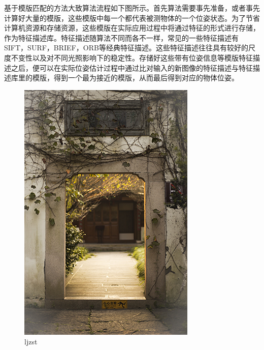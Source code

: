 基于模版匹配的方法大致算法流程如下图所示。首先算法需要事先准备，或者事先计算好大量的模版，这些模版中每一个都代表被测物体的一个位姿状态。为了节省计算机资源和存储资源，这些模版在实际应用过程中将通过特征的形式进行存储，作为特征描述库。特征描述随算法不同而各不一样，常见的一些特征描述有SIFT\cite{lowe1999object}，SURF\cite{bay2006surf}，BRIEF\cite{calonder2010brief}，ORB\cite{rublee2011orb}等经典特征描述。这些特征描述往往具有较好的尺度不变性以及对不同光照影响下的稳定性。存储好这些带有位姿信息等模版特征描述之后，便可以在实际位姿估计过程中通过比对输入的新图像的特征描述与特征描述库里的模版，得到一个最为接近的模版，从而最后得到对应的物体位姿。
\begin{figure}[htb]
	\centering 
	\includegraphics[scale=1.0]{./Pictures/test.jpg} 
	\caption{ljzst} 
\end{figure}

